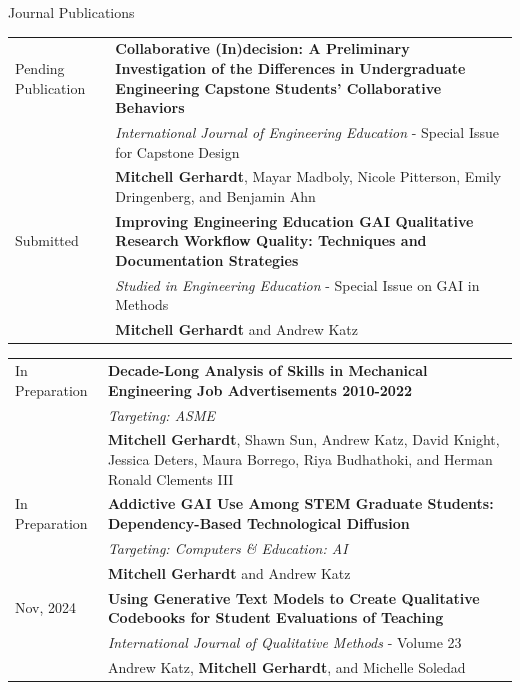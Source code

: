 \documentclass{resume}
\begin{document}
\begin{rSection}{Journal Publications}
\begin{tabularx}{\textwidth}{p{2.5cm}X}
Pending \newline Publication & \textbf{Collaborative (In)decision: A Preliminary Investigation of the Differences in Undergraduate Engineering Capstone Students' Collaborative Behaviors}\\
& \emph{International Journal of Engineering Education} - Special Issue for Capstone Design\\
& \textbf{Mitchell Gerhardt}, Mayar Madboly, Nicole Pitterson, Emily Dringenberg, and Benjamin Ahn\\[1em]

Submitted & \textbf{Improving Engineering Education GAI Qualitative Research Workflow Quality: Techniques and Documentation Strategies}\\
& \emph{Studied in Engineering Education} - Special Issue on GAI in Methods\\
& \textbf{Mitchell Gerhardt} and Andrew Katz  \\

\end{tabularx}


\begin{tabularx}{\textwidth}{p{2.5cm}X}

In \newline Preparation & \textbf{Decade-Long Analysis of Skills in Mechanical Engineering Job Advertisements 2010-2022}\\
& \emph{Targeting: ASME}\\
& \textbf{Mitchell Gerhardt}, Shawn Sun, Andrew Katz, David Knight, Jessica Deters, Maura Borrego, Riya Budhathoki, and Herman Ronald Clements III  \\[2em]


In \newline Preparation & \textbf{Addictive GAI Use Among STEM Graduate Students: Dependency-Based Technological Diffusion}\\
& \emph{Targeting: Computers \& Education: AI}\\
& \textbf{Mitchell Gerhardt} and Andrew Katz  \\[1em]

Nov, 2024 & \textbf{Using Generative Text Models to Create Qualitative Codebooks for Student Evaluations of Teaching} \hspace{2em [\href{https://doi.org/10.1177/16094069241293283}{Paper}]}\\
& \emph{International Journal of Qualitative Methods} - Volume 23\\
& Andrew Katz, \textbf{Mitchell Gerhardt}, and Michelle Soledad\\

\end{tabularx}
\end{rSection}
\end{document}
